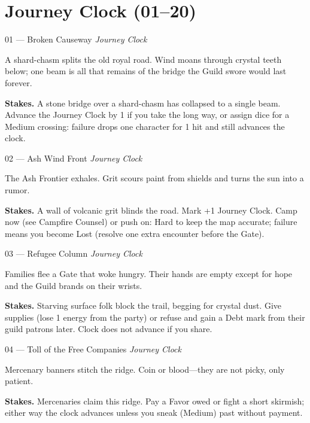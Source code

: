 \section{Journey Clock (01--20)}

\begin{encounterentry}{01 --- Broken Causeway}
\textit{Journey Clock}

A shard-chasm splits the old royal road. Wind moans through crystal teeth below; one beam is all that remains of the bridge the Guild swore would last forever.

\textbf{Stakes.} A stone bridge over a shard-chasm has collapsed to a single beam. Advance the Journey Clock by 1 if you take the long way, or assign dice for a Medium crossing: failure drops one character for 1 hit and still advances the clock.
\end{encounterentry}

\begin{encounterentry}{02 --- Ash Wind Front}
\textit{Journey Clock}

The Ash Frontier exhales. Grit scours paint from shields and turns the sun into a rumor.

\textbf{Stakes.} A wall of volcanic grit blinds the road. Mark +1 Journey Clock. Camp now (see Campfire Counsel) or push on: Hard to keep the map accurate; failure means you become Lost (resolve one extra encounter before the Gate).
\end{encounterentry}

\begin{encounterentry}{03 --- Refugee Column}
\textit{Journey Clock}

Families flee a Gate that woke hungry. Their hands are empty except for hope and the Guild brands on their wrists.

\textbf{Stakes.} Starving surface folk block the trail, begging for crystal dust. Give supplies (lose 1 energy from the party) or refuse and gain a Debt mark from their guild patrons later. Clock does not advance if you share.
\end{encounterentry}

\begin{encounterentry}{04 --- Toll of the Free Companies}
\textit{Journey Clock}

Mercenary banners stitch the ridge. Coin or blood---they are not picky, only patient.

\textbf{Stakes.} Mercenaries claim this ridge. Pay a Favor owed or fight a short skirmish; either way the clock advances unless you sneak (Medium) past without payment.
\end{encounterentry}

